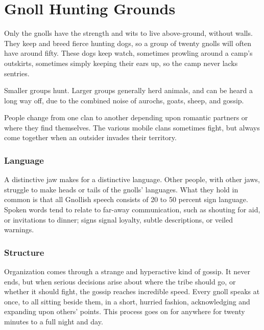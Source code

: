 \section[Gnolls]{Gnoll Hunting Grounds \Nl}
\label{GnollishGrounds}

\begin{multicols}{2}
\renewcommand\npcsymbol{\Nl}

\noindent
Only the gnolls have the strength and wits to live above-ground, without walls.
They keep and breed fierce hunting dogs, so a group of twenty gnolls will often have around fifty.
These dogs keep watch, sometimes prowling around a camp's outskirts, sometimes simply keeping their ears up, so the camp never lacks sentries.

Smaller groups hunt.
Larger groups generally herd animals, and can be heard a long way off, due to the combined noise of aurochs, goats, sheep, and gossip.

People change from one clan to another depending upon romantic partners or where they find themselves.
The various mobile clans sometimes fight, but always come together when an outsider invades their territory.

\subsubsection{Language}

A distinctive jaw makes for a distinctive language.
Other people, with other jaws, struggle to make heads or tails of the gnolls' languages.
What they hold in common is that all Gnollish speech consists of 20 to 50 percent sign language.
Spoken words tend to relate to far-away communication, such as shouting for aid, or invitations to dinner; signs signal loyalty, subtle descriptions, or veiled warnings.

\subsubsection{Structure}

Organization comes through a strange and hyperactive kind of gossip.
It never ends, but when serious decisions arise about where the tribe should go, or whether it should fight, the gossip reaches incredible speed.
Every gnoll speaks at once, to all sitting beside them, in a short, hurried fashion, acknowledging and expanding upon others' points.
This process goes on for anywhere for twenty minutes to a full night and day.


\end{multicols}
